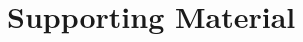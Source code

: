 \documentclass[twoside]{iitbreport}
\begin{document}
\chapter{Supporting Material}



            

           


\end{document}
